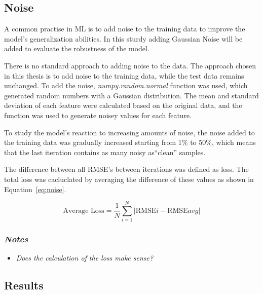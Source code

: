 \subsection{Noise}\label{subsec:noise}
A common practise in \ac{ML} is to add noise to the training data to improve the model's
generalization abilities.
In this sturdy adding Gaussian Noise will be added to evaluate the robustness of the model.

There is no standard approach to adding noise to the data. The approach chosen in this thesis
is to add noise to the training data, while the test data remains unchanged.
To add the noise, \textit{numpy.random.normal} function was used, which generated random numbers
with a Gaussian distribution.
The mean and standard deviation of each feature were calculated based on the original data, and
the function was used to generate noisey values for each feature.

To study the model's reaction to increasing amounts of noise, the noise added to the training
data was gradually increased starting from 1\% to 50\%, which means that the last iteration
contains as many noisy as``clean'' samples.

The difference between all \ac{RMSE}'s between iterations was defined as loss.
The total loss was cacluclated by averaging the difference of these values as shown in
Equation~\ref{eq:noise}.

\begin{tcolorbox}[arc=0pt,boxrule=0.5pt]
    \begin{equation}
        \text{Average Loss} = \frac{1}{N} \sum_{i=1}^{N} |\text{RMSE}i - \text{RMSE}{avg}|\label
        {eq:noise}
    \end{equation}
\end{tcolorbox}

\subsubsection*{\textit{Notes}}

\begin{itemize}
    \item \textit{Does the calculation of the loss make sense?}
\end{itemize}

\subsection{Results}\label{subsec:results-robustness}

